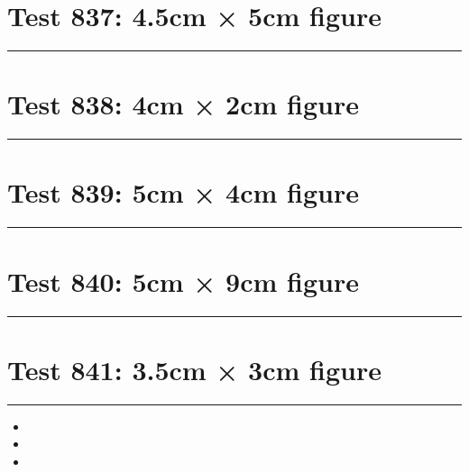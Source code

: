 \documentclass[a4paper,11pt]{article}
\begin{document}
\section*{Test 837: 4.5cm × 5cm figure}
\begin{swarmwrap}%
  \begin{minipage}[t]{4cm}
    \centering
    \rule{\linewidth}{5cm}
  \end{minipage}%
\end{swarmwrap}%
\swarmwrapnext
\lipsum[103]
\lipsum[104]
\lipsum[105]
\lipsum[106]
\lipsum[107]
\section*{Test 838: 4cm × 2cm figure}
\begin{swarmwrap}%
  \begin{minipage}[t]{4cm}
    \centering
    \rule{\linewidth}{2cm}
  \end{minipage}%
\end{swarmwrap}%
\swarmwrapnext
\lipsum[68]
\lipsum[69]
\lipsum[70]
\lipsum[71]
\lipsum[72]
\section*{Test 839: 5cm × 4cm figure}
\begin{swarmwrap}%
  \begin{minipage}[t]{5cm}
    \centering
    \rule{\linewidth}{4cm}
  \end{minipage}%
\end{swarmwrap}%
\swarmwrapnext
\lipsum[105]
\lipsum[106]
\lipsum[107]
\section*{Test 840: 5cm × 9cm figure}
\begin{swarmwrap}%
  \begin{minipage}[t]{5cm}
    \centering
    \rule{\linewidth}{9cm}
  \end{minipage}%
\end{swarmwrap}%
\swarmwrapnext
\lipsum[26]
\lipsum[27]
\lipsum[28]
\lipsum[29]
\section*{Test 841: 3.5cm × 3cm figure}
\begin{swarmwrap}%
  \begin{minipage}[t]{3cm}
    \centering
    \rule{\linewidth}{3cm}
  \end{minipage}%
\end{swarmwrap}%
\swarmwrapnext
\lipsum[32]
\begin{itemize}
  \item \lipsum[33][1-3]
  \item \lipsum[34][1-3]
  \item \lipsum[35][1-3]
\end{itemize}
\end{document}
